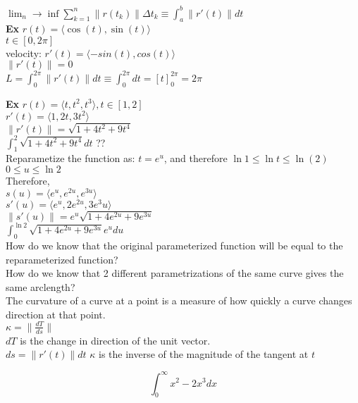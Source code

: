 \documentclass[]{article}
\begin{document}
$\lim_n\to\inf \sum_{k=1}^{n} \|r(t_k)\|\Delta t_k \equiv \int_a^b\|r'(t)\|dt$\\


\textbf{Ex}
$r(t) = \langle{\cos(t),\sin(t)}\rangle$\\
$t \in [0, 2\pi]$\\

velocity: $r'(t)=\langle{-sin(t),cos(t)}\rangle$\\
$\|r'(t)\| = 0$\\
$L = \int_{0}^{2\pi}\|r'(t)\|dt \equiv \int_{0}^{2\pi}dt = [t]_0^{2\pi} = 2\pi$
\newpage

\textbf{Ex} $r(t) = \langle{t,t^2,t^3}\rangle, t\in[1,2]$\\
$r'(t) = \langle{1,2t,3t^2}\rangle$\\
$\|r'(t)\| = \sqrt{1 + 4t^2 + 9t^4}$\\
$\int_1^2\sqrt{1 + 4t^2 + 9t^4}dt$ ??\\
Reparametize the function as: $t = e^u$, and therefore $\ln{1} \leq \ln{t} \leq \ln(2)$\\
$0\leq{u}\leq\ln{2}$\\
Therefore, \\
$s(u) = \langle{e^u,e^{2u},e^{3u}}\rangle$\\
$s'(u) = \langle{e^u,2e^{2u},3e^3u}\rangle$\\
$\|s'(u)\| = e^u \sqrt{1 + 4e^{2u} + 9e^{3u}}$\\
$\int_{0}^{\ln{2}} \sqrt{1 + 4e^{2u} + 9e^{3u}} e^u du$\\
How do we know that the original parameterized function will be equal to the reparameterized function?\\
How do we know that 2 different parametrizations of the same curve gives the same arclength?\\



The curvature of a curve at a point is a measure of how quickly a curve changes direction at that point.\\
$\kappa=\|\frac{dT}{ds}\|$\\
$dT$ is the change in direction of the unit vector.\\
$ds = \|r'(t)\|dt$
$\kappa$ is the inverse of the magnitude of the tangent at $t$

\begin{equation}
    \int_{0}^{\infty } x^2-2x^3dx
\end{equation}
    
\end{document}
